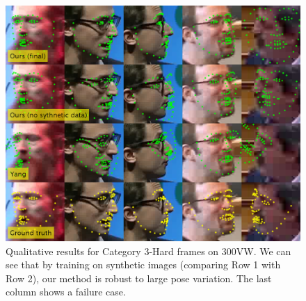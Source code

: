\documentclass[letterpaper]{article} %
\begin{document}
\begin{figure}[t]
\begin{center}
   \includegraphics[width=1\linewidth]{fig/300vw_vis_hard.png}
\end{center}
   \caption{Qualitative results for Category 3-Hard frames on 300VW. We can see that by training on synthetic images (comparing Row 1 with Row 2), our method is robust to large pose variation. The last column shows a failure case.}
\label{fig:300vw_vis_hard}
\end{figure}

\end{document}
